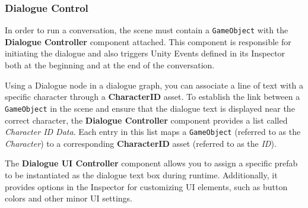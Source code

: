 \subsubsection{Dialogue Control}
In order to run a conversation, the scene must contain a \verb|GameObject| with the \textbf{Dialogue Controller} component attached. This component is responsible for initiating the dialogue and also triggers Unity Events defined in its Inspector both at the beginning and at the end of the conversation. 

Using a Dialogue node in a dialogue graph, you can associate a line of text with a specific character through a \textbf{CharacterID} asset. To establish the link between a \verb|GameObject| in the scene and ensure that the dialogue text is displayed near the correct character, the \textbf{Dialogue Controller} component provides a list called \textit{Character ID Data}. Each entry in this list maps a \verb|GameObject| (referred to as the \textit{Character}) to a corresponding \textbf{CharacterID} asset (referred to as the \textit{ID}).

The \textbf{Dialogue UI Controller} component allows you to assign a specific prefab to be instantiated as the dialogue text box during runtime. Additionally, it provides options in the Inspector for customizing UI elements, such as button colors and other minor UI settings.
